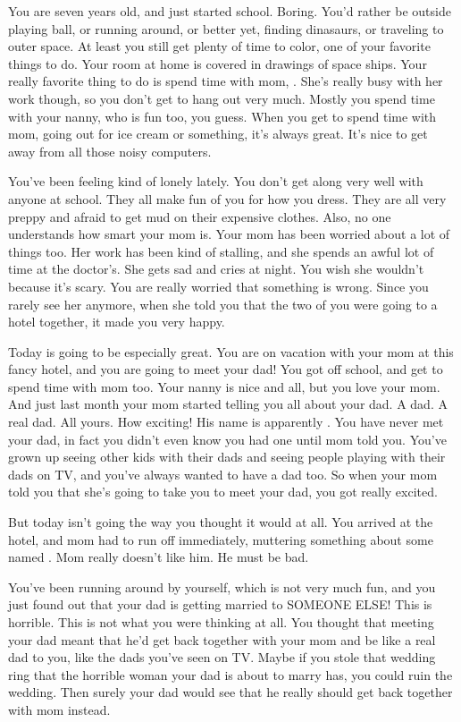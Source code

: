 \documentclass[char]{guildcamp1}
\begin{document}
\name{\cKid{}}

You are seven years old, and just started school. Boring. You'd rather be outside playing ball, or running around, or better yet, finding dinasaurs, or traveling to outer space. At least you still get plenty of time to color, one of your favorite things to do. Your room at home is covered in drawings of space ships. Your really favorite thing to do is spend time with mom, \cScientist{}. She's really busy with her work though, so you don't get to hang out very much. Mostly you spend time with your nanny, who is fun too, you guess. When you get to spend time with mom, going out for ice cream or something, it's always great. It's nice to get away from all those noisy computers.

You've been feeling kind of lonely lately. You don't get along very well with anyone at school. They all make fun of you for how you dress. They are all very preppy and afraid to get mud on their expensive clothes.  Also, no one understands how smart your mom is. Your mom has been worried about a lot of things too. Her work has been kind of stalling, and she spends an awful lot of time at the doctor's. She gets sad and cries at night. You wish she wouldn't because it's scary. You are really worried that something is wrong. Since you rarely see her anymore, when she told you that the two of you were going to a hotel together, it made you very happy.

Today is going to be especially great. You are on vacation with your mom at this fancy hotel, and you are going to meet your dad! You got off school, and get to spend time with mom too. Your nanny is nice and all, but you love your mom. And just last month your mom started telling you all about your dad. A dad. A real dad. All yours. How exciting! His name is apparently \cGroomA{}. You have never met your dad, in fact you didn't even know you had one until mom told you. You've grown up seeing other kids with their dads and seeing people playing with their dads on TV, and you've always wanted to have a dad too. So when your mom told you that she's going to take you to meet your dad, you got really excited.

But today isn't going the way you thought it would at all. You arrived at the hotel, and mom had to run off immediately, muttering something about some \cRival{\human} named \cRival{}. Mom really doesn't like him. He must be bad.

You've been running around by yourself, which is not very much fun, and you just found out that your dad is getting married to SOMEONE ELSE! This is horrible. This is not what you were thinking at all. You thought that meeting your dad meant that he'd get back together with your mom and be like a real dad to you, like the dads you've seen on TV. Maybe if you stole that wedding ring that the horrible woman your dad is about to marry has, you could ruin the wedding. Then surely your dad would see that he really should get back together with mom instead.
\end{document}
